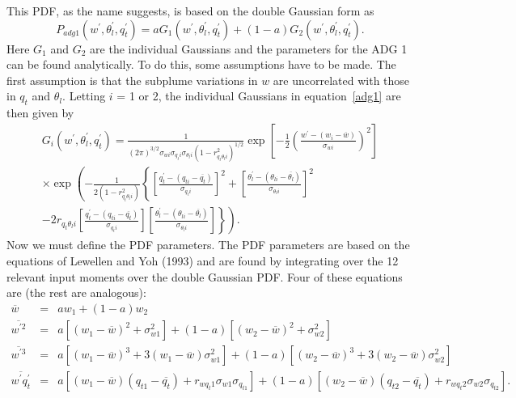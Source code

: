 \documentclass[12pt,titlepage]{article}
\numberwithin{equation}{section}
\begin{document}
This PDF, as the name suggests, is based on the double Gaussian form as
%
\begin{equation}
  P_{adg1}(w^{'},\theta_{l}^{'},q_{t}^{'})=aG_{1}(w^{'},\theta_{l}^{'},q_{t}^{'})+(1-a)G_{2}(w^{'},\theta_{l}^{'},q_{t}^{'}).
  \label{adg1}
\end{equation}
%
Here $G_{1}$ and $G_{2}$ are the individual Gaussians and the parameters for the ADG 1 can be found analytically.  To do this, some assumptions have to be made.  The first assumption is that the subplume variations in $w$ are uncorrelated with those in $q_{t}$ and $\theta_{l}$.  Letting $i$ = 1 or 2, the individual Gaussians in equation~\ref{adg1} are then given by
%
\begin{equation}
  \label{ind_gaus}
  \begin{split}
    G_{i}(w^{'},\theta_{l}^{'},q_{t}^{'})=\frac{1}{(2\pi)^{3/2}\sigma_{wi}\sigma_{q_{t}i}\sigma_{\theta_{l}i}(1-r_{q_{t}\theta_{l}i}^{2})^{1/2}}\exp\left[-\frac{1}{2}\left(\frac{w^{'}-(w_{i}-\overline{w})}{\sigma_{wi}}\right)^{2}\right] \\
    \times \exp\left(-\frac{1}{2(1-r_{q_{t}\theta_{l}i}^{2})}\left\{\left[\frac{q_{t}^{'}-(q_{ti}-\overline{q_{t}})}{\sigma_{q_{t}i}}\right]^{2}+\left[\frac{\theta_{l}^{'}-(\theta_{li}-\overline{\theta_{l}})}{\sigma_{\theta_{l}i}}\right]^{2} \right. \right. \\
    -\left.\left.2r_{q_{t}\theta_{l}i}\left[\frac{q_{t}^{'}-(q_{ti}-\overline{q_{t}})}{\sigma_{q_{t}i}}\right]\left[\frac{\theta_{l}^{'}-(\theta_{li}-\overline{\theta_{l}})}{\sigma_{\theta_{l}i}}\right]\right\}\right).
  \end{split}
\end{equation}
%
Now we must define the PDF parameters.  The PDF parameters are based on the equations of Lewellen and Yoh (1993) and are found by integrating over the 12 relevant input moments over the double Gaussian PDF.  Four of these equations are (the rest are analogous):
%
\begin{eqnarray}
    \overline{w} &=& aw_{1}+(1-a)w_{2}  \label{mom_equations} \\
    \overline{w^{'2}} &=& a[(w_{1}-\overline{w})^{2}+\sigma_{w1}^{2}]+(1-a)[(w_{2}-\overline{w})^{2}+\sigma_{w2}^{2}] \nonumber \\
    \overline{w^{'3}} &=& a[(w_{1}-\overline{w})^{3}+3(w_{1}-\overline{w})\sigma_{w1}^{2}]+(1-a)[(w_{2}-\overline{w})^{3}+3(w_{2}-\overline{w})\sigma_{w2}^{2}] \nonumber \\
    \overline{w^{'}q_{t}^{'}} &=& a[(w_{1}-\overline{w})(q_{t1}-\overline{q_{t}})+r_{wq_{t}1}\sigma_{w1}\sigma_{q_{t1}}]+(1-a)[(w_{2}-\overline{w})(q_{t2}-\overline{q_{t}})+r_{wq_{t}2}\sigma_{w2}\sigma_{q_{t2}}]. \nonumber
\end{eqnarray}
\end{document}
